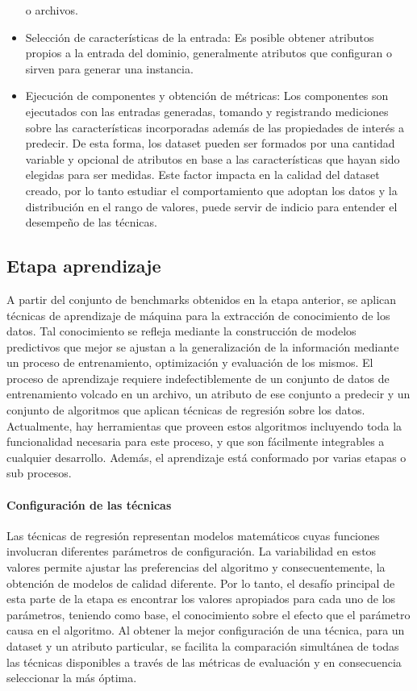 \begin{itemize}
o archivos. 
\item Selección de características de la entrada: Es posible obtener atributos
propios a la entrada del dominio, generalmente atributos que configuran
o sirven para generar una instancia. 
\item Ejecución de componentes y obtención de métricas: Los componentes
son ejecutados con las entradas generadas, tomando y registrando mediciones
sobre las características incorporadas además de las propiedades de
interés a predecir. De esta forma, los dataset pueden ser formados
por una cantidad variable y opcional de atributos en base a las características
que hayan sido elegidas para ser medidas. Este factor impacta en la
calidad del dataset creado, por lo tanto estudiar el comportamiento
que adoptan los datos y la distribución en el rango de valores, puede
servir de indicio para entender el desempeño de las técnicas. 
\end{itemize}

\subsection{Etapa aprendizaje}

A partir del conjunto de benchmarks obtenidos en la etapa anterior,
se aplican técnicas de aprendizaje de máquina para la extracción de
conocimiento de los datos. Tal conocimiento se refleja mediante la
construcción de modelos predictivos que mejor se ajustan a la generalización
de la información mediante un proceso de entrenamiento, optimización
y evaluación de los mismos. El proceso de aprendizaje requiere indefectiblemente
de un conjunto de datos de entrenamiento volcado en un archivo, un
atributo de ese conjunto a predecir y un conjunto de algoritmos que
aplican técnicas de regresión sobre los datos. Actualmente, hay herramientas
que proveen estos algoritmos incluyendo toda la funcionalidad necesaria
para este proceso, y que son fácilmente integrables a cualquier desarrollo.
Además, el aprendizaje está conformado por varias etapas o sub procesos.


\paragraph{Configuración de las técnicas }

Las técnicas de regresión representan modelos matemáticos cuyas funciones
involucran diferentes parámetros de configuración. La variabilidad
en estos valores permite ajustar las preferencias del algoritmo y
consecuentemente, la obtención de modelos de calidad diferente. Por
lo tanto, el desafío principal de esta parte de la etapa es encontrar
los valores apropiados para cada uno de los parámetros, teniendo como
base, el conocimiento sobre el efecto que el parámetro causa en el
algoritmo. Al obtener la mejor configuración de una técnica, para
un dataset y un atributo particular, se facilita la comparación simultánea
de todas las técnicas disponibles a través de las métricas de evaluación
y en consecuencia seleccionar la más óptima. 




